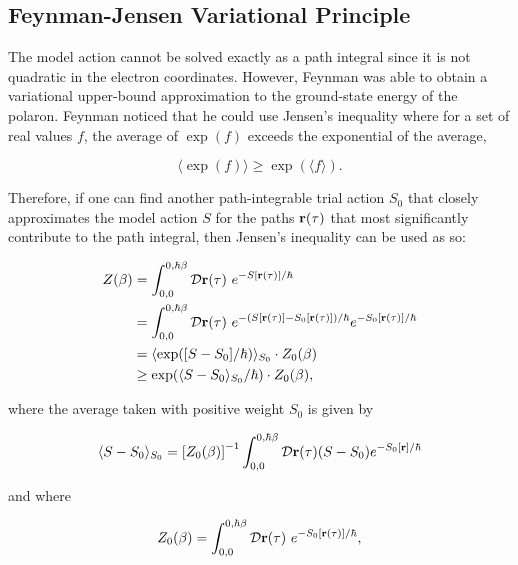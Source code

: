 \subsection{Feynman-Jensen Variational Principle}
\label{subsec:2-2-2}

The model action cannot be solved exactly as a path integral since it is not quadratic in the electron coordinates. However, Feynman was able to obtain a variational upper-bound approximation to the ground-state energy of the polaron. Feynman noticed that he could use Jensen's inequality where for a set of real values $f$, the average of $\exp(f)$ exceeds the exponential of the average,

\begin{equation}
    \langle \exp(f) \rangle \geq \exp(\langle f \rangle).
\end{equation}

Therefore, if one can find another path-integrable trial action $S_0$ that closely approximates the model action $S$ for the paths $\vb{r}(\tau)$ that most significantly contribute to the path integral, then Jensen's inequality can be used as so:

\begin{equation}
    \begin{aligned}
        Z(\beta) &= \int_{0, 0}^{0, \hbar\beta} \mathcal{D} \vb{r}(\tau)\ e^{-S[\mathbf{r}(\tau)]/\hbar} \\ &= \int_{0, 0}^{0, \hbar\beta} \mathcal{D} \vb{r}(\tau)\ e^{-\left(S[\mathbf{r}(\tau)] - S_0[\mathbf{r}(\tau)]\right) / \hbar} e^{-S_0[\mathbf{r}(\tau)]/\hbar} \\
        &= \langle \exp( [S - S_0]  / \hbar) \rangle_{S_0} \cdot Z_0(\beta) \\
        &\geq \exp(\langle S - S_0 \rangle_{S_0} / \hbar) \cdot Z_0(\beta) ,
    \end{aligned}
\end{equation}

where the average taken with positive weight $S_0$ is given by

\begin{equation}
    \langle S-S_0 \rangle_{S_0} = \left[ Z_0(\beta) \right]^{-1} \int_{0, 0}^{0, \hbar\beta} \mathcal{D}\vb{r}(\tau) (S-S_0) e^{-S_0[\vb{r}]/ \hbar}
\end{equation}

and where

\begin{equation}
    Z_0(\beta) = \int_{0, 0}^{0, \hbar\beta} \mathcal{D} \vb{r}(\tau)\ e^{-S_0[\mathbf{r}(\tau)]/\hbar} ,
\end{equation}

